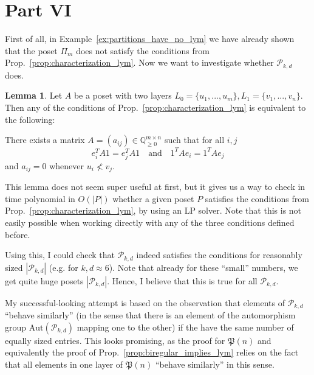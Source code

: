 \documentclass{scrartcl}
\newcommand{\Q}{\mathbb{Q}}
\newcommand{\powerset}{\mathfrak{P}}
\theoremstyle{definition}
\newtheorem{lemma}[definition]{Lemma}
\begin{document}
\section{Part VI}
First of all, in Example~\ref{ex:partitions_have_no_lym} we have already shown that the poset $\Pi_m$ does not satisfy the conditions from Prop.~\ref{prop:characterization_lym}.
Now we want to investigate whether $\mathcal{P}_{k, d}$ does. 
\begin{lemma}
    Let $A$ be a poset with two layers $L_0 = \{ u_1, ..., u_m \}, L_1 = \{ v_1, ..., v_n \}$.
    Then any of the conditions of Prop.~\ref{prop:characterization_lym} is equivalent to the following:

    There exists a matrix $A = (a_{ij}) \in \Q_{\geq 0}^{m \times n}$ such that for all $i, j$
    \begin{equation*}
        e_i^T A 1 = e_j^T A 1 \quad \text{and} \quad 1^T A e_i = 1^T A e_j
    \end{equation*}
    and $a_{ij} = 0$ whenever $u_i \not< v_j$.
\end{lemma}
This lemma does not seem super useful at first, but it gives us a way to check in time polynomial in $O(|P|)$ whether a given poset $P$ satisfies the conditions from Prop.~\ref{prop:characterization_lym}, by using an LP solver.
Note that this is not easily possible when working directly with any of the three conditions defined before.

Using this, I could check that $\mathcal{P}_{k, d}$ indeed satisfies the conditions for reasonably sized $|\mathcal{P}_{k, d}|$ (e.g. for $k, d \approx 6$).
Note that already for these ``small'' numbers, we get quite huge posets $|\mathcal{P}_{k, d}|$.
Hence, I believe that this is true for all $\mathcal{P}_{k, d}$.

My successful-looking attempt is based on the observation that elements of $\mathcal{P}_{k, d}$ ``behave similarly'' (in the sense that there is an element of the automorphism group $\mathrm{Aut}(\mathcal{P}_{k, d})$ mapping one to the other) if the have the same number of equally sized entries.
This looks promising, as the proof for $\powerset(n)$ and equivalently the proof of Prop.~\ref{prop:biregular_implies_lym} relies on the fact that all elements in one layer of $\powerset(n)$ ``behave similarly'' in this sense.
\end{document}
